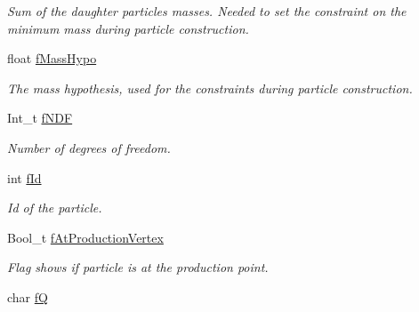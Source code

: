 \begin{DoxyCompactItemize}
\begin{DoxyCompactList}\small\item\em Sum of the daughter particles masses. Needed to set the constraint on the minimum mass during particle construction. \end{DoxyCompactList}\item 
float \hyperlink{classKFParticleBase_a36fd93a21d2d16ac791d5e1ba767ee38}{f\+Mass\+Hypo}\hypertarget{classKFParticleBase_a36fd93a21d2d16ac791d5e1ba767ee38}{}\label{classKFParticleBase_a36fd93a21d2d16ac791d5e1ba767ee38}

\begin{DoxyCompactList}\small\item\em The mass hypothesis, used for the constraints during particle construction. \end{DoxyCompactList}\item 
Int\+\_\+t \hyperlink{classKFParticleBase_aeb5e1343407d7e851b9087133bf42732}{f\+N\+DF}\hypertarget{classKFParticleBase_aeb5e1343407d7e851b9087133bf42732}{}\label{classKFParticleBase_aeb5e1343407d7e851b9087133bf42732}

\begin{DoxyCompactList}\small\item\em Number of degrees of freedom. \end{DoxyCompactList}\item 
int \hyperlink{classKFParticleBase_a14cbc0e0366410bda673a2eeedddecf3}{f\+Id}\hypertarget{classKFParticleBase_a14cbc0e0366410bda673a2eeedddecf3}{}\label{classKFParticleBase_a14cbc0e0366410bda673a2eeedddecf3}

\begin{DoxyCompactList}\small\item\em Id of the particle. \end{DoxyCompactList}\item 
Bool\+\_\+t \hyperlink{classKFParticleBase_a6577f7c0a81c362bb19bdefa2bd89908}{f\+At\+Production\+Vertex}\hypertarget{classKFParticleBase_a6577f7c0a81c362bb19bdefa2bd89908}{}\label{classKFParticleBase_a6577f7c0a81c362bb19bdefa2bd89908}

\begin{DoxyCompactList}\small\item\em Flag shows if particle is at the production point. \end{DoxyCompactList}\item 
char \hyperlink{classKFParticleBase_a2668110f8c75522e1cfc51496652435e}{fQ}\hypertarget{classKFParticleBase_a2668110f8c75522e1cfc51496652435e}{}\label{classKFParticleBase_a2668110f8c75522e1cfc51496652435e}


\end{DoxyCompactItemize}
